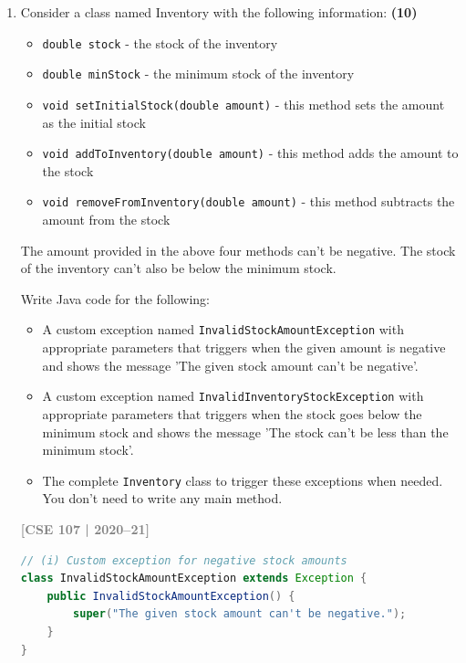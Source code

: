\documentclass[12pt,a3paper]{article}
\newcommand{\yr}[1]{\hfill\textcolor{gray}{\small\textbf{[#1]}}}
\begin{document}
\begin{enumerate}
\begin{tcolorbox}
\begin{lstlisting}[language=Java]
    void credit(double amount) throws InvalidAmountException {
        if (amount < 0) {
            throw new InvalidAmountException(amount);
        }
        this.balance += amount;
    }
}
\end{lstlisting}
\end{tcolorbox}

\item Consider a class named Inventory with the following information: \hfill \textbf{(10)}
\begin{itemize}
    \item \texttt{double stock} - the stock of the inventory
    \item \texttt{double minStock} - the minimum stock of the inventory
    \item \texttt{void setInitialStock(double amount)} - this method sets the amount as the initial stock
    \item \texttt{void addToInventory(double amount)} - this method adds the amount to the stock
    \item \texttt{void removeFromInventory(double amount)} - this method subtracts the amount from the stock
\end{itemize}
The amount provided in the above four methods can't be negative. The stock of the inventory can't also be below the minimum stock.

Write Java code for the following:
\begin{itemize}
    \item[(i)] A custom exception named \texttt{InvalidStockAmountException} with appropriate parameters that triggers when the given amount is negative and shows the message 'The given stock amount can't be negative'.
    \item[(ii)] A custom exception named \texttt{InvalidInventoryStockException} with appropriate parameters that triggers when the stock goes below the minimum stock and shows the message 'The stock can't be less than the minimum stock'.
    \item[(iii)] The complete \texttt{Inventory} class to trigger these exceptions when needed. You don't need to write any main method.
\end{itemize}
\yr{CSE 107 | 2020--21}

\begin{tcolorbox}[enhanced,breakable,ansbox,
  colback=cE!4,colframe=cE,boxrule=0.8pt,arc=5pt,
  title={\textbf{Answer --- Inventory Class with Custom Exceptions}},
  fonttitle=\bfseries\color{white},colbacktitle=cE]
\begin{lstlisting}[language=Java]
// (i) Custom exception for negative stock amounts
class InvalidStockAmountException extends Exception {
    public InvalidStockAmountException() {
        super("The given stock amount can't be negative.");
    }
}


\end{lstlisting}
\end{tcolorbox}
\end{enumerate}
\end{document}
